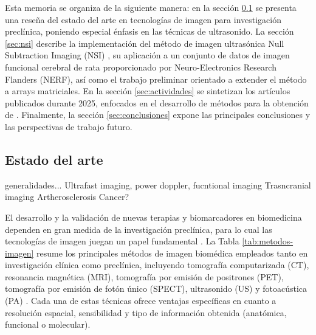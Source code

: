 \documentclass[10pt,a4paper]{article}
\begin{document}
Esta memoria se organiza de la siguiente manera: en la sección \ref{sec:estado_arte} se presenta una reseña del estado del arte en tecnologías de imagen para investigación preclínica, poniendo especial énfasis en las técnicas de ultrasonido. La sección \ref{sec:nsi} describe la implementación del método de imagen ultrasónica Null Subtraction Imaging (NSI) \cite{Agarwal2019_NSI}, su aplicación a un conjunto de datos de imagen funcional cerebral de rata proporcionado por Neuro-Electronics Research Flanders (NERF), así como el trabajo preliminar orientado a extender el método a arrays matriciales. En la sección \ref{sec:actividades} se sintetizan los artículos publicados durante 2025, enfocados en el desarrollo de métodos para la obtención de . Finalmente, la sección \ref{sec:conclusiones} expone las principales conclusiones y las perspectivas de trabajo futuro.



\subsection{Estado del arte}\label{sec:estado_arte}

generalidades...
Ultrafast imaging, power doppler, fucntional imaging
Trasncranial imaging
Artherosclerosis
Cancer?

El desarrollo y la validación de nuevas terapias y biomarcadores en biomedicina dependen en gran medida de la investigación preclínica, para lo cual las tecnologías de imagen juegan un papel fundamental \cite{Rovera2025}. La Tabla \ref{tab:metodos-imagen} resume los principales métodos de imagen biomédica empleados tanto en investigación clínica como preclínica, incluyendo tomografía computarizada (CT), resonancia magnética (MRI), tomografía por emisión de positrones (PET), tomografía por emisión de fotón único (SPECT), ultrasonido (US) y fotoacústica (PA) \cite{Bushberg2021}. Cada una de estas técnicas ofrece ventajas específicas en cuanto a resolución espacial, sensibilidad y tipo de información obtenida (anatómica, funcional o molecular).
\end{document}
